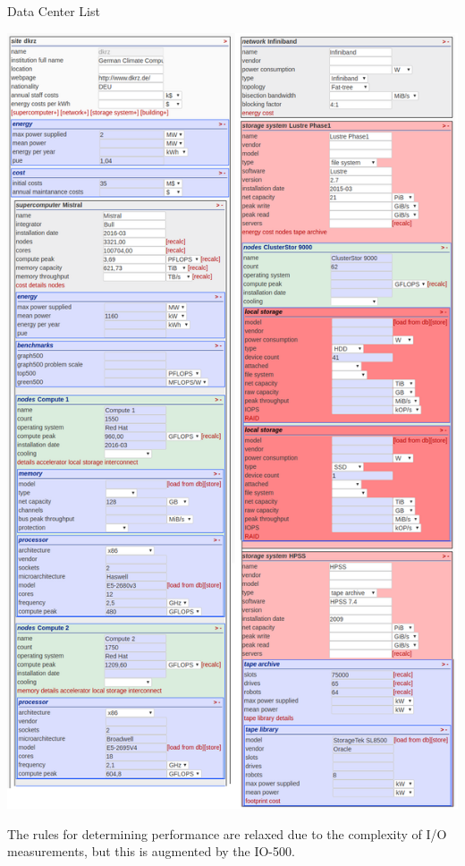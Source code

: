 \documentclass[portrait,a0paper,fontscale=0.4]{baposter}
\begin{document}
\begin{poster}
\begin{posterbox}[name=schedule,column=2,span=1, above=bottom, below=io500]{Data Center List}
\vspace*{-0.65em}

\includegraphics[width=\textwidth]{schema}

\vspace*{-1em}

The rules for determining performance are relaxed due to the complexity of I/O measurements, but this is augmented by the IO-500.
\end{posterbox}





\end{poster}
\end{document}
